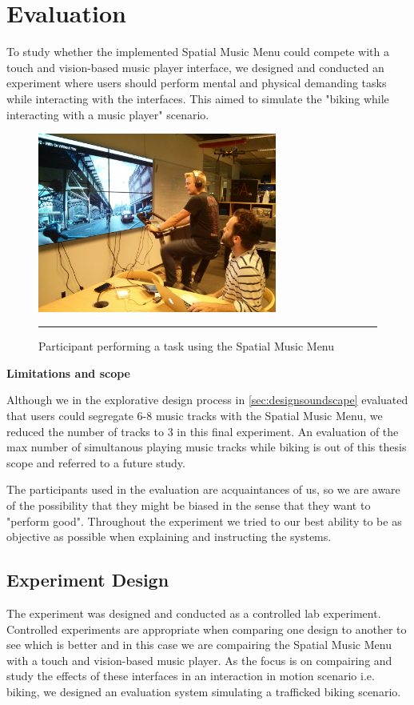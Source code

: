 \chapter{Evaluation}
\label{sec:evaluation}
To study whether the implemented Spatial Music Menu could compete with a touch and vision-based music player interface, we designed and conducted an experiment where users should perform mental and physical demanding tasks while interacting with the interfaces. This aimed to simulate the "biking while interacting with a music player" scenario.

\begin{figure}[h]
	\centering
		\includegraphics[width=0.7\textwidth,height=\textheight,keepaspectratio]{./Figures/evaluation_spatial.jpg}
		\rule{35em}{1pt}
	\caption[Evaluation Spatial Music Menu]{Participant performing a task using the Spatial Music Menu}
	\label{fig:evalspatial}
\end{figure}

\textbf{Limitations and scope}

Although we in the explorative design process in \ref{sec:designsoundscape} evaluated that users could segregate 6-8 music tracks with the Spatial Music Menu, we reduced the number of tracks to 3 in this final experiment. An evaluation of the max number of simultanous playing music tracks while biking is out of this thesis scope and referred to a future study.

The participants used in the evaluation are acquaintances of us, so we are aware of the possibility that they might be biased in the sense that they want to "perform good". Throughout the experiment we tried to our best ability to be as objective as possible when explaining and instructing the systems.


\section{Experiment Design}
The experiment was designed and conducted as a controlled lab experiment. Controlled experiments are appropriate when comparing one design to another to see which is better \cite{benyon_designing_2010} and in this case we are compairing the Spatial Music Menu with a touch and vision-based music player. As the focus is on compairing and study the effects of these interfaces in an interaction in motion scenario i.e. biking, we designed an evaluation system simulating a trafficked biking scenario.

